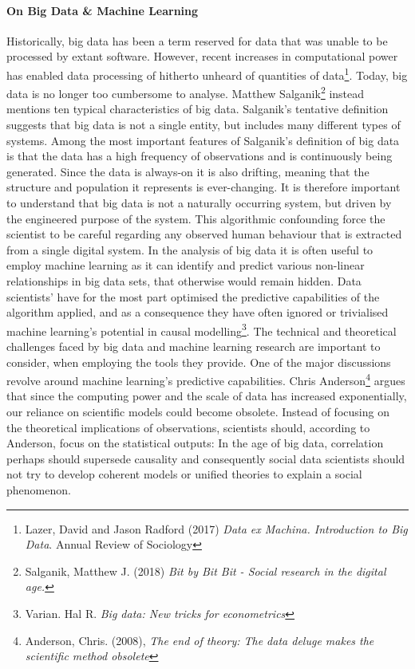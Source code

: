 \documentclass[12pt,a4paper]{article}
\begin{document}
\paragraph{On Big Data \& Machine Learning\newline}
Historically, big data has been a term reserved for data that was unable to be processed by extant software. However, recent increases in computational power has enabled data processing of hitherto unheard of quantities of data\footnote{Lazer, David and Jason Radford (2017) \textit{Data ex Machina. Introduction to Big Data}. Annual Review of Sociology}. Today, big data is no longer too cumbersome to analyse. Matthew Salganik\footnote{Salganik, Matthew J. (2018) \textit{Bit by Bit Bit - Social research in the digital age.}} instead mentions ten typical characteristics of big data. Salganik's tentative definition suggests that big data is not a single entity, but includes many different types of systems. Among the most important features of Salganik's definition of big data is that the data has a high frequency of observations and is continuously being generated. Since the data is always-on it is also drifting, meaning that the structure and population it represents is ever-changing. It is therefore important to understand that big data is not a naturally occurring system, but driven by the engineered purpose of the system. This algorithmic confounding force the scientist to be careful regarding any observed human behaviour that is extracted from a single digital system.\newline
In the analysis of big data it is often useful to employ machine learning as it can identify and predict various non-linear relationships in big data sets, that otherwise would remain hidden. Data scientists' have for the most part optimised the predictive capabilities of the algorithm applied, and as a consequence they have often ignored or trivialised machine learning's potential in causal modelling\footnote{Varian. Hal R. \textit{Big data: New tricks for econometrics}}.\newline
The technical and theoretical challenges faced by big data and machine learning research are important to consider, when employing the tools they provide. One of the major discussions revolve around machine learning's predictive capabilities. Chris Anderson\footnote{Anderson, Chris. (2008), \textit{The end of theory: The data deluge makes the scientific method obsolete}} argues that since the computing power and the scale of data has increased exponentially, our reliance on scientific models could become obsolete. Instead of focusing on the theoretical implications of observations, scientists should, according to Anderson, focus on the statistical outputs: In the age of big data, correlation perhaps should supersede causality and consequently social data scientists should not try to develop coherent models or unified theories to explain a social phenomenon.\newline
\end{document}
